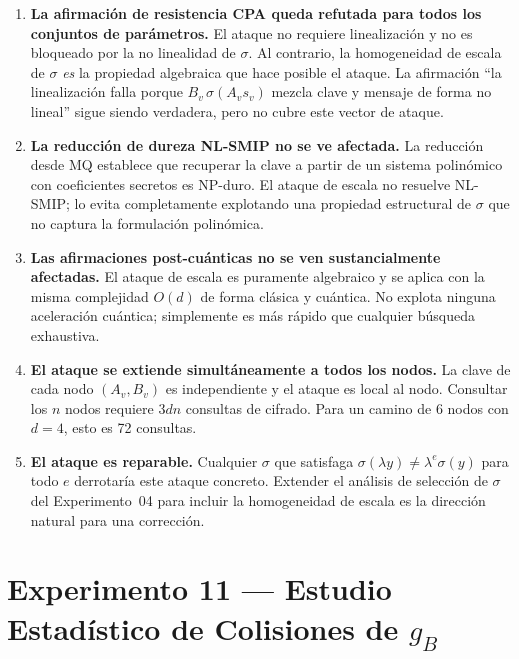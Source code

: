\documentclass[12pt,a4paper]{article}
\theoremstyle{definition}
\begin{document}
\begin{enumerate}

  \item \textbf{La afirmación de resistencia CPA queda refutada para
    todos los conjuntos de parámetros.} El ataque no requiere
    linealización y no es bloqueado por la no linealidad de $\sigma$.
    Al contrario, la homogeneidad de escala de $\sigma$ \emph{es}
    la propiedad algebraica que hace posible el ataque. La afirmación
    ``la linealización falla porque $B_v\,\sigma(A_v s_v)$ mezcla
    clave y mensaje de forma no lineal'' sigue siendo verdadera, pero
    no cubre este vector de ataque.

  \item \textbf{La reducción de dureza NL-SMIP no se ve afectada.}
    La reducción desde MQ establece que recuperar la clave a partir
    de un sistema polinómico con coeficientes secretos es NP-duro.
    El ataque de escala no resuelve NL-SMIP; lo evita completamente
    explotando una propiedad estructural de $\sigma$ que no captura
    la formulación polinómica.

  \item \textbf{Las afirmaciones post-cuánticas no se ven
    sustancialmente afectadas.} El ataque de escala es puramente
    algebraico y se aplica con la misma complejidad $O(d)$ de forma
    clásica y cuántica. No explota ninguna aceleración cuántica;
    simplemente es más rápido que cualquier búsqueda exhaustiva.

  \item \textbf{El ataque se extiende simultáneamente a todos los
    nodos.} La clave de cada nodo $(A_v, B_v)$ es independiente y
    el ataque es local al nodo. Consultar los $n$ nodos requiere
    $3dn$ consultas de cifrado. Para un camino de 6 nodos con
    $d = 4$, esto es 72 consultas.

  \item \textbf{El ataque es reparable.} Cualquier $\sigma$ que
    satisfaga $\sigma(\lambda y) \neq \lambda^e \sigma(y)$ para todo
    $e$ derrotaría este ataque concreto. Extender el análisis de
    selección de $\sigma$ del Experimento~04 para incluir la
    homogeneidad de escala es la dirección natural para una
    corrección.

\end{enumerate}

\section{Experimento 11 --- Estudio Estadístico de Colisiones de $g_B$}
\end{document}
